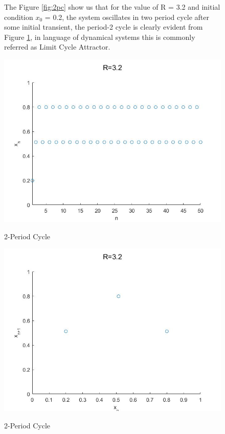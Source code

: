 \documentclass[11pt,a4paper]{article}
\begin{document}
\begin{figure}[H]
{
The Figure \ref{fig:2pc} show us that for the value of R = 3.2 and initial condition $x_{0}$ = 0.2, the system oscillates in two period cycle after some initial transient, the period-2 cycle is clearly evident from Figure \ref{fig:2pc1}, in language of dynamical systems this is commonly referred as Limit Cycle Attractor. \par\bigskip
\centering
\includegraphics[scale=0.5]{images/2-period.jpg}
\caption{2-Period Cycle}\par\medskip
\label{fig:2pc}
\includegraphics[scale=0.5]{images/2-period1.jpg}
\caption{2-Period Cycle}\par\medskip
\label{fig:2pc1}
}
\end{figure}
\end{document}
